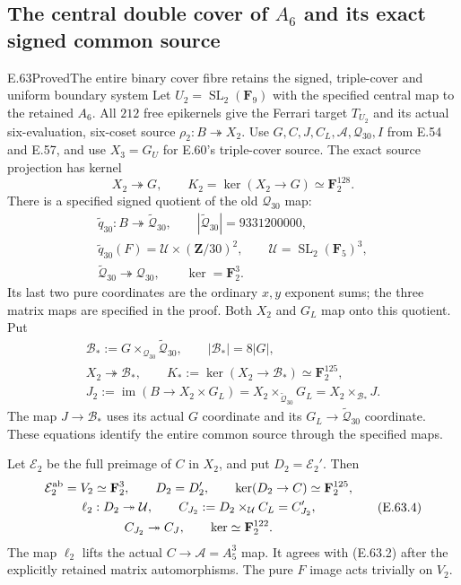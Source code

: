 \subsection{The central double cover of \texorpdfstring{$A_6$}{A6} and its exact signed common source}

\begin{statement}{E.63}{Proved}{The entire binary cover fibre retains the signed, triple-cover and uniform boundary system}
Let $U_2=\operatorname{SL}_2(\mathbf F_9)$ with the specified
central map to the retained $A_6$. All $212$ free epikernels
give the Ferrari target $T_{U_2}$ and its actual six-evaluation,
six-coset source $\rho_2:B\twoheadrightarrow X_2$.
Use $G,C,J,C_L,\mathcal A,\mathcal Q_{30},I$ from E.54
and E.57, and use $X_3=G_U$ for E.60's triple-cover source.
The exact source projection has kernel
\[
 X_2\twoheadrightarrow G,\qquad
 K_2=\ker(X_2\to G)\simeq\mathbf F_2^{128}.
 \tag{E.63.1}
\]
There is a specified signed quotient of the old
$\mathcal Q_{30}$ map:
\[
 \begin{gathered}
 \widetilde q_{30}:B\twoheadrightarrow\widetilde{\mathcal Q}_{30},
 \qquad |\widetilde{\mathcal Q}_{30}|=9331200000,\\
 \widetilde q_{30}(F)
   =\mathcal U\times(\mathbf Z/30)^2,\qquad
 \mathcal U=\operatorname{SL}_2(\mathbf F_5)^3,\\
 \widetilde{\mathcal Q}_{30}\twoheadrightarrow\mathcal Q_{30},
 \qquad\ker=\mathbf F_2^3.
 \end{gathered}
 \tag{E.63.2}
\]
Its last two pure coordinates are the ordinary $x,y$ exponent
sums; the three matrix maps are specified in the proof.
Both $X_2$ and $G_L$ map onto this quotient. Put
\[
 \begin{gathered}
 \mathcal B_*:=G\times_{\mathcal Q_{30}}
                              \widetilde{\mathcal Q}_{30},
 \qquad |\mathcal B_*|=8|G|,\\
 X_2\twoheadrightarrow\mathcal B_*,\qquad
 K_*:=\ker(X_2\to\mathcal B_*)\simeq\mathbf F_2^{125},\\
 J_2:=\operatorname{im}(B\to X_2\times G_L)
      =X_2\times_{\widetilde{\mathcal Q}_{30}}G_L
      =X_2\times_{\mathcal B_*}J.
 \end{gathered}
 \tag{E.63.3}
\]
The map $J\to\mathcal B_*$ uses its actual $G$ coordinate
and its $G_L\to\widetilde{\mathcal Q}_{30}$ coordinate.
These equations identify the entire common source through
the specified maps.

Let $\mathcal E_2$ be the full preimage of $C$ in $X_2$,
and put $D_2=\mathcal E_2'$. Then
\[
 \begin{gathered}
 \mathcal E_2^{\rm ab}=V_2\simeq\mathbf F_2^3,
 \qquad D_2=D_2',\qquad
 \ker(D_2\to C)\simeq\mathbf F_2^{125},\\
 \ell_2:D_2\twoheadrightarrow\mathcal U,
 \qquad C_{J_2}:=D_2\times_{\mathcal U}C_L=C_{J_2}',\\
 C_{J_2}\twoheadrightarrow C_J,
 \qquad\ker\simeq\mathbf F_2^{122}.
 \end{gathered}
 \tag{E.63.4}
\]
The map $\ell_2$ lifts the actual $C\to\mathcal A=A_5^3$
map. It agrees with \textup{(E.63.2)} after the explicitly
retained matrix automorphisms. The pure $F$ image acts
trivially on $V_2$.


\end{statement}
